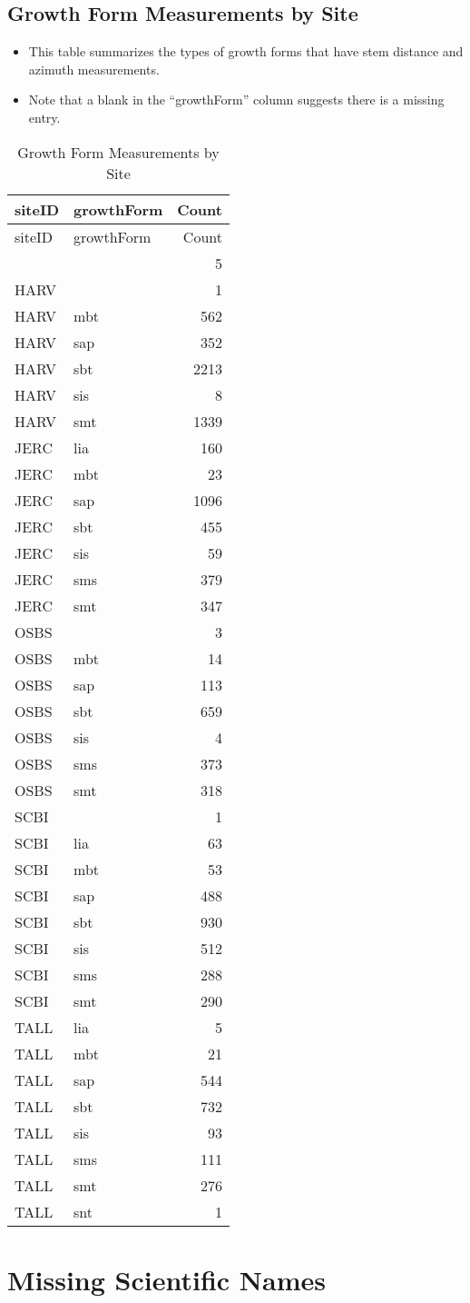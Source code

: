 \documentclass[]{article}
\begin{document}
\pagebreak

\subsection{Growth Form Measurements by
Site}\label{growth-form-measurements-by-site}

\begin{itemize}
\itemsep1pt\parskip0pt
\item
  This table summarizes the types of growth forms that have stem
  distance and azimuth measurements.
\item
  Note that a blank in the ``growthForm'' column suggests there is a
  missing entry.
\end{itemize}

\begin{longtable}[c]{@{}llr@{}}
\caption{Growth Form Measurements by Site}\tabularnewline
\toprule
siteID & growthForm & Count\tabularnewline
\midrule
\endfirsthead
\toprule
siteID & growthForm & Count\tabularnewline
\midrule
\endhead
& & 5\tabularnewline
HARV & & 1\tabularnewline
HARV & mbt & 562\tabularnewline
HARV & sap & 352\tabularnewline
HARV & sbt & 2213\tabularnewline
HARV & sis & 8\tabularnewline
HARV & smt & 1339\tabularnewline
JERC & lia & 160\tabularnewline
JERC & mbt & 23\tabularnewline
JERC & sap & 1096\tabularnewline
JERC & sbt & 455\tabularnewline
JERC & sis & 59\tabularnewline
JERC & sms & 379\tabularnewline
JERC & smt & 347\tabularnewline
OSBS & & 3\tabularnewline
OSBS & mbt & 14\tabularnewline
OSBS & sap & 113\tabularnewline
OSBS & sbt & 659\tabularnewline
OSBS & sis & 4\tabularnewline
OSBS & sms & 373\tabularnewline
OSBS & smt & 318\tabularnewline
SCBI & & 1\tabularnewline
SCBI & lia & 63\tabularnewline
SCBI & mbt & 53\tabularnewline
SCBI & sap & 488\tabularnewline
SCBI & sbt & 930\tabularnewline
SCBI & sis & 512\tabularnewline
SCBI & sms & 288\tabularnewline
SCBI & smt & 290\tabularnewline
TALL & lia & 5\tabularnewline
TALL & mbt & 21\tabularnewline
TALL & sap & 544\tabularnewline
TALL & sbt & 732\tabularnewline
TALL & sis & 93\tabularnewline
TALL & sms & 111\tabularnewline
TALL & smt & 276\tabularnewline
TALL & snt & 1\tabularnewline
\bottomrule
\end{longtable}

\pagebreak

\section{Missing Scientific Names}\label{missing-scientific-names}
\end{document}
